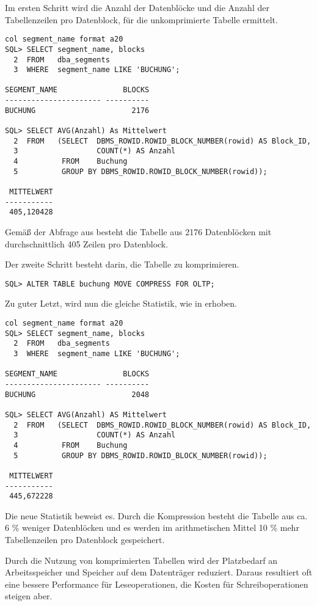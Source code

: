           Im ersten Schritt wird die Anzahl der Datenbl\"ocke und die Anzahl der Tabellenzeilen pro Datenblock, f\"ur die unkomprimierte Tabelle  ermittelt.
          \begin{lstlisting}[caption={Anzahl der Datenbl\"ocke + durchschnittliche Anzahl der Zeilen pro Block},label=admin307,language=oracle_sql,alsolanguage=sqlplus]
col segment_name format a20
SQL> SELECT segment_name, blocks
  2  FROM   dba_segments
  3  WHERE  segment_name LIKE 'BUCHUNG';

SEGMENT_NAME               BLOCKS
---------------------- ----------
BUCHUNG                      2176

SQL> SELECT AVG(Anzahl) As Mittelwert
  2  FROM   (SELECT  DBMS_ROWID.ROWID_BLOCK_NUMBER(rowid) AS Block_ID,
  3                  COUNT(*) AS Anzahl
  4          FROM    Buchung
  5          GROUP BY DBMS_ROWID.ROWID_BLOCK_NUMBER(rowid));

 MITTELWERT
-----------
 405,120428
          \end{lstlisting}
          Gem\"a\ss{} der Abfrage aus  besteht die Tabelle  aus 2176 Datenbl\"ocken mit durchschnittlich 405 Zeilen pro Datenblock.

          Der zweite Schritt besteht darin, die Tabelle  zu komprimieren.
          \begin{lstlisting}[caption={Komprimieren der Tabelle \identifier{Buchung}},label=admin308,language=oracle_sql]
SQL> ALTER TABLE buchung MOVE COMPRESS FOR OLTP;
          \end{lstlisting}
          Zu guter Letzt, wird nun die gleiche Statistik, wie in  erhoben.
          \begin{lstlisting}[caption={Anzahl der Datenbl\"ocke + durchschnittliche Anzahl der Zeilen pro Block nach der Kompression},label=admin309,language=oracle_sql,alsolanguage=sqlplus]
col segment_name format a20
SQL> SELECT segment_name, blocks
  2  FROM   dba_segments
  3  WHERE  segment_name LIKE 'BUCHUNG';

SEGMENT_NAME               BLOCKS
---------------------- ----------
BUCHUNG                      2048

SQL> SELECT AVG(Anzahl) AS Mittelwert
  2  FROM   (SELECT  DBMS_ROWID.ROWID_BLOCK_NUMBER(rowid) AS Block_ID,
  3                  COUNT(*) AS Anzahl
  4          FROM    Buchung
  5          GROUP BY DBMS_ROWID.ROWID_BLOCK_NUMBER(rowid));

 MITTELWERT
-----------
 445,672228
          \end{lstlisting}
          Die neue Statistik beweist es. Durch die Kompression besteht die Tabelle  aus ca. 6 \% weniger Datenbl\"ocken und es werden im arithmetischen Mittel 10 \% mehr Tabellenzeilen pro Datenblock gespeichert.
          \begin{merke}
            Durch die Nutzung von komprimierten Tabellen wird der Platzbedarf an Arbeitsspeicher und Speicher auf dem Datentr\"ager reduziert. Daraus resultiert oft eine bessere Performance f\"ur Leseoperationen, die Kosten f\"ur Schreiboperationen steigen aber.
          \end{merke}
